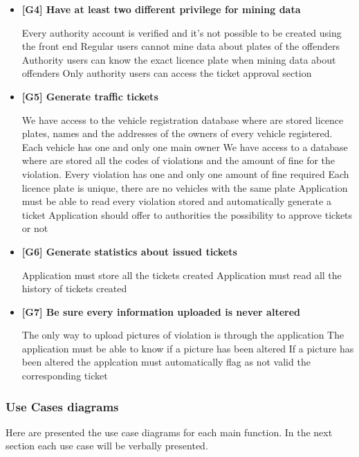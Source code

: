 \begin{itemize}
\item \textbf{[G4] Have at least two different privilege for mining data} %
\begin{itemize}
   Every authority account is verified and it's not possible to be created using the front end
   Regular users cannot mine data about plates of the offenders
   Authority users can know the exact licence plate when mining data about offenders
   Only authority users can access the ticket approval section
\end{itemize}

\item \textbf{[G5] Generate traffic tickets}
\begin{itemize}
   We have access to the vehicle registration database where are stored licence plates, names and the addresses of the owners of every vehicle registered. Each vehicle has one and only one main owner
   We have access to a database where are stored all the codes of violations and the amount of fine for the violation. Every violation has one and only one amount of fine required
   Each licence plate is unique, there are no vehicles with the same plate
   Application must be able to read every violation stored and automatically generate a ticket
   Application should offer to authorities the possibility to approve tickets or not
\end{itemize}

\item \textbf{[G6] Generate statistics about issued tickets}
\begin{itemize}
   Application must store all the tickets created
   Application must read all the history of tickets created
\end{itemize}

\item \textbf{[G7] Be sure every information uploaded is never altered}
\begin{itemize}
  The only way to upload pictures of violation is through the application
  The application must be able to know if a picture has been altered
  If a picture has been altered the applcation must automatically flag as not valid the corresponding ticket
\end{itemize}

\end{itemize}


\subsubsection{Use Cases diagrams}
Here are presented the use case diagrams for each main function. In the next section each use case will be verbally presented.

